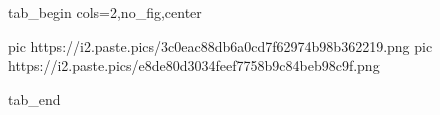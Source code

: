  
 
 
 
 

\ifcmt
  tab_begin cols=2,no_fig,center

     pic https://i2.paste.pics/3c0eac88db6a0cd7f62974b98b362219.png
		 pic https://i2.paste.pics/e8de80d3034feef7758b9c84beb98c9f.png

  tab_end
\fi
